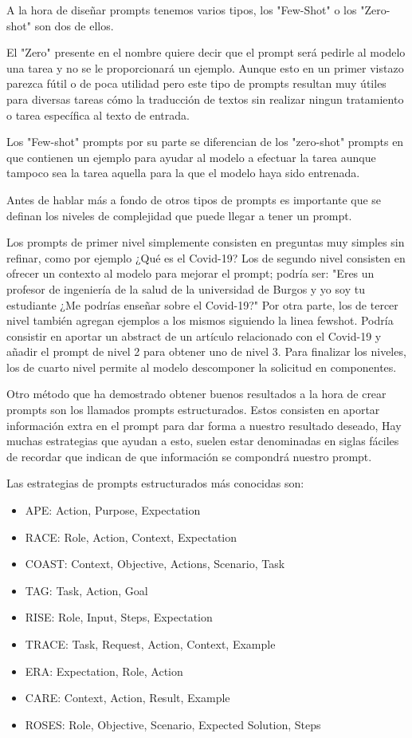 A la hora de diseñar prompts tenemos varios tipos, los "Few-Shot" o los "Zero-shot" son dos de ellos. 

El "Zero" presente en el nombre quiere decir que el prompt será pedirle al modelo una tarea y no se le proporcionará un ejemplo. Aunque esto en un primer vistazo parezca fútil o de poca utilidad pero este tipo de prompts resultan muy útiles para diversas tareas cómo la traducción de textos sin realizar ningun tratamiento o tarea específica al texto de entrada.

Los "Few-shot" prompts por su parte se diferencian de los "zero-shot" prompts en que contienen un ejemplo para ayudar al modelo a efectuar la tarea aunque tampoco sea la tarea aquella para la que el modelo haya sido entrenada.

Antes de hablar más a fondo de otros tipos de prompts es importante que se definan los niveles de complejidad que puede llegar a tener un prompt.

Los prompts de primer nivel simplemente consisten en preguntas muy simples sin refinar, como por ejemplo ¿Qué es el Covid-19?
Los de segundo nivel consisten en ofrecer un contexto al modelo para mejorar el prompt; podría ser: "Eres un profesor de ingeniería de la salud de la universidad de Burgos y yo soy tu estudiante ¿Me podrías enseñar sobre el Covid-19?"
Por otra parte, los de tercer nivel también agregan ejemplos a los mismos siguiendo la linea fewshot. Podría consistir en aportar un abstract de un artículo relacionado con el Covid-19 y añadir el prompt de nivel 2 para obtener uno de nivel 3. Para finalizar los niveles, los de cuarto nivel permite al modelo descomponer la solicitud en componentes.

Otro método que ha demostrado obtener buenos resultados a la hora de crear prompts son los llamados prompts estructurados. Estos consisten en aportar información extra en el prompt para dar forma a nuestro resultado deseado, Hay muchas estrategias que ayudan a esto, suelen estar denominadas en siglas fáciles de recordar que indican de que información se compondrá nuestro prompt.

Las estrategias de prompts estructurados más conocidas son:

\begin{itemize}
    \item APE: Action, Purpose, Expectation
    \item RACE: Role, Action, Context, Expectation
    \item COAST: Context, Objective, Actions, Scenario, Task
    \item TAG: Task, Action, Goal
    \item RISE: Role, Input, Steps, Expectation
    \item TRACE: Task, Request, Action, Context, Example
    \item ERA: Expectation, Role, Action
    \item CARE: Context, Action, Result, Example
    \item ROSES: Role, Objective, Scenario, Expected Solution, Steps
    
\end{itemize}
\cite{edi_hezri_hairi_2_2023}


